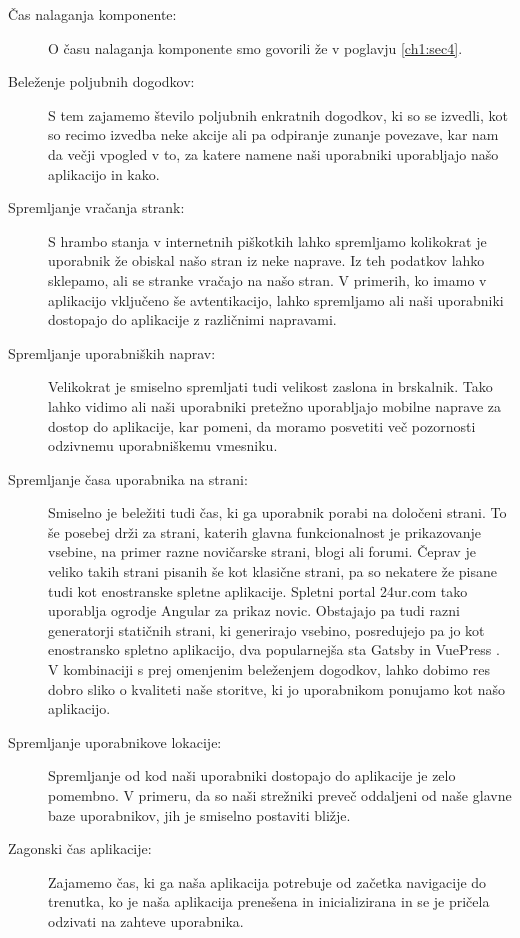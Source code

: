 \documentclass[a4paper, 12pt]{book}
\begin{document}
\begin{description}
	\item[Čas nalaganja komponente:] O času nalaganja komponente smo govorili že v poglavju \ref{ch1:sec4}.
	\item[Beleženje poljubnih dogodkov:] S tem zajamemo število poljubnih enkratnih dogodkov, ki so se izvedli, kot so recimo izvedba neke akcije ali pa odpiranje zunanje povezave, kar nam da večji vpogled v to, za katere namene naši uporabniki uporabljajo našo aplikacijo in kako.
	\item[Spremljanje vračanja strank:] S hrambo stanja v internetnih piškotkih lahko spremljamo kolikokrat je uporabnik že obiskal našo stran iz neke naprave. Iz teh podatkov lahko sklepamo,  ali se stranke vračajo na našo stran. V primerih, ko imamo v aplikacijo vključeno še avtentikacijo, lahko spremljamo ali naši uporabniki dostopajo do aplikacije z različnimi napravami.
	\item[Spremljanje uporabniških naprav:] Velikokrat je smiselno spremljati tudi velikost zaslona in brskalnik. Tako lahko vidimo ali naši uporabniki pretežno uporabljajo mobilne naprave za dostop do aplikacije, kar pomeni, da moramo posvetiti več pozornosti odzivnemu uporabniškemu vmesniku.
	\item[Spremljanje časa uporabnika na strani:] Smiselno je beležiti tudi čas, ki ga uporabnik porabi na določeni strani. To še posebej drži za strani, katerih glavna funkcionalnost je prikazovanje vsebine, na primer razne novičarske strani, blogi ali forumi. Čeprav je veliko takih strani pisanih še kot klasične strani, pa so nekatere že pisane tudi kot enostranske spletne aplikacije. Spletni portal 24ur.com tako uporablja ogrodje Angular za prikaz novic. Obstajajo pa tudi razni generatorji statičnih strani, ki generirajo vsebino, posredujejo pa jo kot enostransko spletno aplikacijo, dva popularnejša sta Gatsby \cite{gatsby_website} in VuePress \cite{vuepress_website}. V kombinaciji s prej omenjenim beleženjem dogodkov, lahko dobimo res dobro sliko o kvaliteti naše storitve, ki jo uporabnikom ponujamo kot našo aplikacijo.
	\item[Spremljanje uporabnikove lokacije:] Spremljanje od kod naši uporabniki dostopajo do aplikacije je zelo pomembno. V primeru, da so naši strežniki preveč oddaljeni od naše glavne baze uporabnikov, jih je smiselno postaviti bližje.
	\item[Zagonski čas aplikacije:] Zajamemo čas, ki ga naša aplikacija potrebuje od začetka navigacije do trenutka, ko je naša aplikacija prenešena in inicializirana in se je pričela odzivati na zahteve uporabnika.

\end{description}
\end{document}
